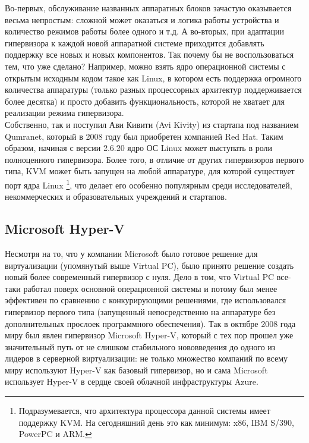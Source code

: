 \documentclass[14pt, a4paper]{article}
\begin{document}
Во-первых, обслуживание названных аппаратных блоков зачастую оказывается весьма
непростым: сложной может оказаться и логика работы устройства и количество
режимов работы более одного и т.д. А во-вторых, при адаптации гипервизора к каждой 
новой аппаратной системе приходится добавлять поддержку все новых и новых
компонентов. Так почему бы не воспользоваться тем, что уже сделано? Например,
можно взять ядро операционной системы с открытым исходным кодом такое как Linux,
в котором есть поддержка огромного количества аппаратуры (только разных
процессорных архитектур поддерживается более десятка) и просто добавить
функциональность, которой не хватает для реализации режима гипервизора.\\

Собственно, так и поступил Ави Кивити (Avi Kivity) из стартапа под названием
Qumranet, который в 2008 году был приобретен компанией Red Hat. Таким образом,
начиная с версии 2.6.20 ядро ОС Linux может выступать в роли полноценного
гипервизора. Более того, в отличие от других гипервизоров первого типа, KVM может
быть запущен на любой аппаратуре, для которой существует порт ядра Linux \footnote{Подразумевается, что архитектура процессора данной системы имеет поддержку KVM. На
сегодняшний день это как минимум: x86, IBM S/390, PowerPC и ARM.}, что
делает его особенно популярным среди исследователей, некоммерческих и
образовательных учреждений и стартапов.

\subsection*{Microsoft Hyper-V}

Несмотря на то, что у компании Microsoft было готовое решение для виртуализации
(упомянутый выше Virtual PC), было принято решение создать новый более
современный гипервизор с нуля. Дело в том, что Virtual PC все-таки работал поверх
основной операционной системы и потому был менее эффективен по сравнению с
конкурирующими решениями, где использовался гипервизор первого типа
(запущенный непосредственно на аппаратуре без дополнительных прослоек
программного обеспечения). Так в октябре 2008 года миру был явлен гипервизор
Microsoft Hyper-V, который с тех пор прошел уже значительный путь от не слишком
стабильного нововведения до одного из лидеров в серверной виртуализации: не
только множество компаний по всему миру используют Hyper-V как базовый
гипервизор, но и сама Microsoft использует Hyper-V в сердце своей облачной
инфраструктуры Azure.\\
\end{document}
